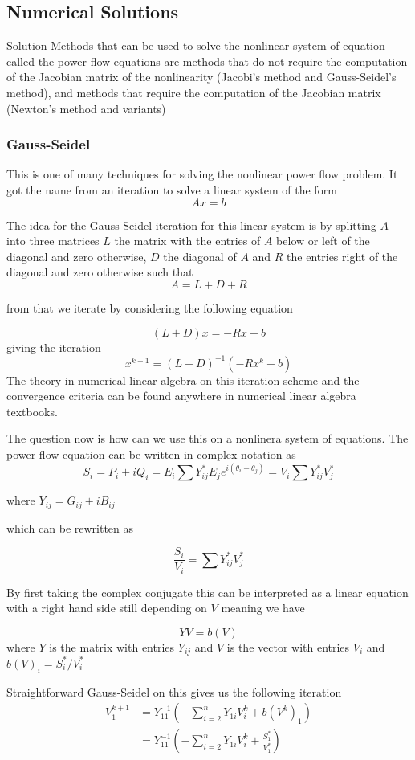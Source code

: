 \subsection{Numerical Solutions}
Solution Methods that can be used to solve the nonlinear system of equation called the power flow equations are methods that do not require the computation of the Jacobian matrix of the nonlinearity (Jacobi's method and Gauss-Seidel’s method), and methods that require the computation of the Jacobian matrix  (Newton’s method and variants)
\subsubsection*{Gauss-Seidel}
This is one of many techniques for solving the nonlinear power flow problem. 
It got the name from an iteration to solve a linear system of the form 
$$
Ax=b$$

The idea for the Gauss-Seidel iteration for this linear system is by splitting $A$ into three matrices $L$ the matrix with the entries of $A$ below or left of the diagonal and zero otherwise, $D$ the diagonal of $A$ and $R$ the entries right of the diagonal and zero otherwise such that
$$
A=L+D+R$$

from that we iterate by considering the following equation

$$
(L+D)x=-Rx+b
$$
giving the iteration 
$$
x^{k+1}=(L+D)^{-1}(-Rx^k+b)
$$
The theory in numerical linear algebra on this iteration scheme and the convergence criteria can be found anywhere in numerical linear algebra textbooks. 


The question now is how can we use this on a nonlinera system of equations. The power flow equation can be written in complex notation as
\[S_i=P_i+iQ_i=E_i\sum Y^*_{ij}E_je^{i(\theta_i-\theta_j)}=V_i\sum Y^*_{ij}V^*_j\]

where $Y_{ij}=G_{ij}+iB_{ij}$

which can be rewritten as

$$
\frac{S_i}{V_i}=\sum Y_{ij}^*V_j^*
$$

By first taking the complex conjugate this can be interpreted as a linear equation with a right hand side still depending on $V$ meaning we have

$$YV=b(V)$$
where $Y$ is the matrix with entries $Y_{ij}$ and $V$ is the vector with entries $V_i$ and $b(V)_i=S^*_i/V^*_i$

Straightforward Gauss-Seidel on this gives us the following iteration
\begin{align}
V_1^{k+1}&=Y_{11}^{-1}(-\sum_{i=2}^{n}Y_{1i}V^k_i+b(V^k)_1)\\
&=Y_{11}^{-1}(-\sum_{i=2}^{n}Y_{1i}V^k_i+\frac{S_1^*}{V_1^*})\\
\end{align}

